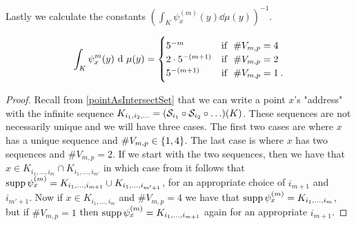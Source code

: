 Lastly we calculate the constants $\left(\int_{K} \psi_{x}^{(m)}(y) \dd \mu(y)\right)^{-1}$. 
\begin{lemma}
	\begin{equation}
		\int_{K} \psi_{x}^{m}(y) \ \text{d} \ \mu(y) = \begin{cases}
			5^{-m} & \text{if } \ \# V_{m,p} = 4 \\
			2\cdot 5^{-(m+1)} & \text{if } \ \# V_{m,p} = 2 \\
			5^{-(m+1)}  & \text{if } \ \# V_{m,p} = 1 \: .
		\end{cases}
	\end{equation}
\end{lemma}

\begin{proof}
Recall from \cref{pointAsIntersectSet} that we can write a point $x$'s "address" with the infinite sequence $K_{i_1, i_2, \ldots} = (\mathcal{S}_{i_1} \circ \mathcal{S}_{i_2} \circ \ldots)(K)$. These sequences are not necessarily unique and we will have three cases. The first two cases are where $x$ has a unique sequence and $\# V_{m,p} \in \cbr{1,4}$. The last case is where $x$ has two sequences and $\# V_{m, p} = 2$. If we start with the two sequences, then we have that $x \in K_{i_1, \ldots, i_m} \cap K_{i_1, \ldots, i_{m'}}$ in which case from  it follows that $\operatorname{supp} \psi_{x}^{(m)} = K_{i_1, \ldots, i_{m+1}} \cup K_{i_1, \ldots, i_{m'+1}}$, for an appropriate choice of $i_{m+1}$ and $i_{m'+1}$. Now if $x\in K_{i_1, \ldots, i_m}$ and $\# V_{m,p} = 4$ we have that $\operatorname{supp}\psi_{x}^{(m)} = K_{i_1, \ldots, i_m}$, but if $\# V_{m,p} = 1$ then $\operatorname{supp}\psi_{x}^{(m)} = K_{i_1, \ldots, i_{m+1}}$ again for an appropriate $i_{m+1}$.


\end{proof}
